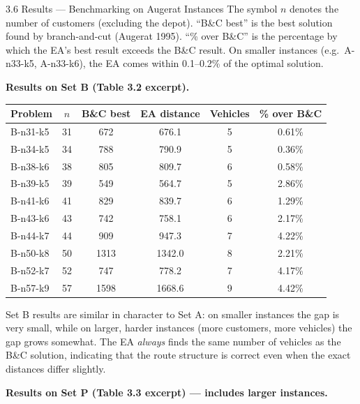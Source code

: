 \documentclass[aspectratio=169,10pt]{beamer}
\begin{document}
\begin{frame}[allowframebreaks]{3.6 Results — Benchmarking on Augerat Instances}
  The symbol $n$ denotes the number of customers (excluding the depot).
  ``B\&C best'' is the best solution found by branch-and-cut (Augerat 1995).
  ``\% over B\&C'' is the percentage by which the EA's best result exceeds the B\&C result.
  On smaller instances (e.g.\ A-n33-k5, A-n33-k6), the EA comes within 0.1--0.2\%
  of the optimal solution.

  \framebreak

  \textbf{Results on Set B (Table 3.2 excerpt).}

  \begin{center}
    \small
    \begin{tabular}{lccccc}
      \toprule
      Problem & $n$ & B\&C best & EA distance & Vehicles & \% over B\&C \\
      \midrule
      B-n31-k5  & 31 & 672 & 676.1 & 5 & 0.61\% \\
      B-n34-k5  & 34 & 788 & 790.9 & 5 & 0.36\% \\
      B-n38-k6  & 38 & 805 & 809.7 & 6 & 0.58\% \\
      B-n39-k5  & 39 & 549 & 564.7 & 5 & 2.86\% \\
      B-n41-k6  & 41 & 829 & 839.7 & 6 & 1.29\% \\
      B-n43-k6  & 43 & 742 & 758.1 & 6 & 2.17\% \\
      B-n44-k7  & 44 & 909 & 947.3 & 7 & 4.22\% \\
      B-n50-k8  & 50 & 1313 & 1342.0 & 8 & 2.21\% \\
      B-n52-k7  & 52 & 747 & 778.2 & 7 & 4.17\% \\
      B-n57-k9  & 57 & 1598 & 1668.6 & 9 & 4.42\% \\
      \bottomrule
    \end{tabular}
  \end{center}

  Set B results are similar in character to Set A: on smaller instances the gap is very small,
  while on larger, harder instances (more customers, more vehicles) the gap grows somewhat.
  The EA \emph{always} finds the same number of vehicles as the B\&C solution,
  indicating that the route structure is correct even when the exact distances differ slightly.

  \framebreak

  \textbf{Results on Set P (Table 3.3 excerpt) — includes larger instances.}


\end{frame}
\end{document}
